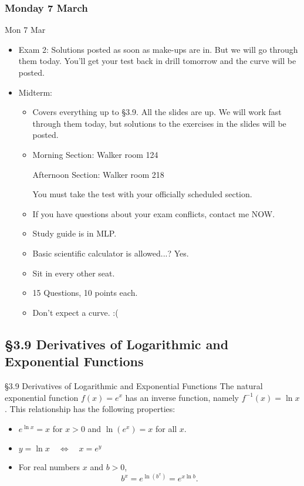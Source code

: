 \documentclass[cal1spr16Lectures.tex]{subfiles}
\begin{document}

\subsubsection{\bf Monday 7 March}

\begin{frame}[allowframebreaks]{Mon 7 Mar}
\begin{itemize}\footnotesize
\item Exam 2: Solutions posted as soon as make-ups are in.  But we will go through them today.  You'll get your test back in drill tomorrow and the curve will be posted.
\item Midterm:
	\begin{itemize}\footnotesize
	\item Covers \alert{everything} up to \alert{\S 3.9}.  All the slides are up.  We will work fast through them today, but solutions to the exercises in the slides will be posted.
	\item Morning Section: Walker room 124
	
	Afternoon Section: Walker room 218
	
	You \alert{must} take the test with your officially scheduled section.
%
\framebreak
	\item If you have questions about your exam conflicts, contact me NOW.  
	\item Study guide is in MLP.
	\item Basic scientific calculator is allowed...? Yes.
	\item Sit in every other seat.
	\item 15 Questions, 10 points each.
	\item Don't expect a curve. :(
	\end{itemize}
\end{itemize}
\end{frame}

\subsection[3.9 Derivatives of Logarithmic and Exponential Functions]{\S 3.9 Derivatives of Logarithmic and Exponential Functions}

\begin{frame}{\S 3.9 Derivatives of Logarithmic and Exponential Functions}\footnotesize
The natural exponential function $f(x)=e^x$ has an inverse function, namely $f^{-1}(x)=\ln x$.  This relationship has the following properties:
\begin{itemize}
\item[1.] $e^{\ln x}=x $ for $x>0$ and $\ln(e^x)=x$ for all $x$.
\item[2.] $y=\ln x \quad\Longleftrightarrow\quad x=e^y$
\item[3.] For real numbers $x$ and $b>0$, 
\[b^x=e^{\ln (b^x)}=e^{x \ln b}.\]
\end{itemize}
\end{frame}
\end{document}
